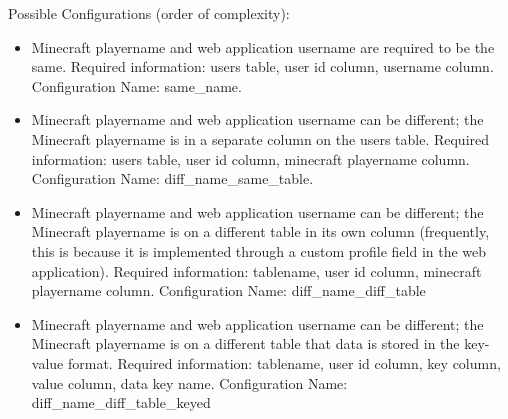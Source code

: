 \documentclass[letterpaper,12pt]{article}
\begin{document}
  Possible Configurations (order of complexity):
  \begin{itemize}
    \item Minecraft playername and web application username are required to be
      the same. Required information: users table, user id column, username
      column. Configuration Name: same\_name.
    \item Minecraft playername and web application username can be different;
      the Minecraft playername is in a separate column on the users table.
      Required information: users table, user id column, minecraft playername
      column. Configuration Name: diff\_name\_same\_table.
    \item Minecraft playername and web application username can be different;
      the Minecraft playername is on a different table in its own column
      (frequently, this is because it is implemented through a custom profile
      field in the web application). Required information: tablename, user id
      column, minecraft playername column.
      Configuration Name: diff\_name\_diff\_table
    \item Minecraft playername and web application username can be different;
      the Minecraft playername is on a different table that data is stored in
      the key-value format. Required information: tablename, user id column,
      key column, value column, data key name.
      Configuration Name: diff\_name\_diff\_table\_keyed
  \end{itemize}
\end{document}
